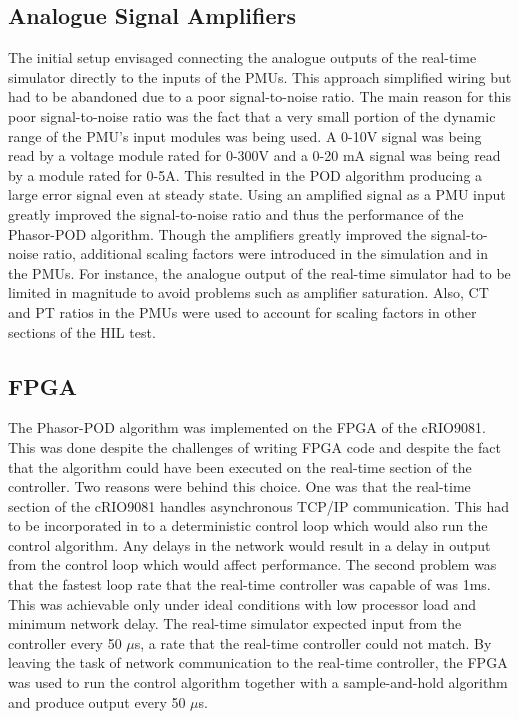 \documentclass[conference]{IEEEtran}
\begin{document}
\subsection{Analogue Signal Amplifiers} The initial setup envisaged connecting the analogue outputs of the real-time simulator directly to the inputs of the PMUs. This approach simplified wiring but had to be abandoned due to a poor signal-to-noise ratio. The main reason for this poor signal-to-noise ratio was the fact that a very small portion of the dynamic range of the PMU's input modules was being used. A 0-10V signal was being read by a voltage module rated for 0-300V and a 0-20 mA signal was being read by a module rated for 0-5A. This resulted in the POD algorithm producing a large error signal even at steady state. Using an amplified signal as a PMU input greatly improved the signal-to-noise ratio and thus the performance of the Phasor-POD algorithm. Though the amplifiers greatly improved the signal-to-noise ratio, additional scaling factors were introduced in the simulation and in the PMUs. For instance, the analogue output of the real-time simulator had to be limited in magnitude to avoid problems such as amplifier saturation. Also, CT and PT ratios in the PMUs were used to account for scaling factors in other sections of the HIL test.

\subsection{FPGA} The Phasor-POD algorithm was implemented on the FPGA of the cRIO9081. This was done despite the challenges of writing FPGA code and despite the fact that the algorithm could have been executed on the real-time section of the controller. Two reasons were behind this choice. One was that the real-time section of the cRIO9081 handles asynchronous TCP/IP communication. This had to be incorporated in to a deterministic control loop which would also run the control algorithm. Any delays in the network would result in a delay in output from the control loop which would affect performance. The second problem was that the fastest loop rate that the real-time controller was capable of was 1ms. This was achievable only under ideal conditions with low processor load and minimum network delay. The real-time simulator expected input from the controller every 50 $\mu$s, a rate that the real-time controller could not match. By leaving the task of network communication to the real-time controller, the FPGA was used to run the control algorithm together with a sample-and-hold algorithm and produce output every 50 $\mu$s.
\end{document}
